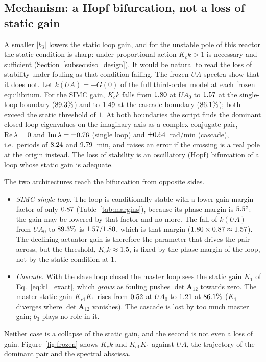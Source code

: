 \subsection{Mechanism: a Hopf bifurcation, not a loss of static gain}
\label{subsec:mechanism}
A smaller $|b_3|$ lowers the static loop gain, and for the unstable pole of this reactor the static condition is sharp: under proportional action $K_ck>1$ is necessary and sufficient (Section~\ref{subsec:siso_design}). It would be natural to read the loss of stability under fouling as that condition failing. The frozen-$UA$ spectra show that it does not. Let $k(UA)=-G(0)$ of the full third-order model at each frozen equilibrium. For the SIMC gain, $K_ck$ falls from $1.80$ at $UA_0$ to $1.57$ at the single-loop boundary ($89.3\%$) and to $1.49$ at the cascade boundary ($86.1\%$); both exceed the static threshold of $1$. At both boundaries the script finds the dominant closed-loop eigenvalues on the imaginary axis as a complex-conjugate pair, $\mathrm{Re}\,\lambda=0$ and $\mathrm{Im}\,\lambda=\pm0.76$ (single loop) and $\pm0.64$~rad/min (cascade), i.e.\ periods of $8.24$ and $9.79$~min, and raises an error if the crossing is a real pole at the origin instead. The loss of stability is an oscillatory (Hopf) bifurcation of a loop whose static gain is adequate.

The two architectures reach the bifurcation from opposite sides.
\begin{itemize}
    \item \emph{SIMC single loop.} The loop is conditionally stable with a lower gain-margin factor of only $0.87$ (Table~\ref{tab:margins}), because its phase margin is $5.5^\circ$: the gain may be lowered by that factor and no more. The fall of $k(UA)$ from $UA_0$ to $89.3\%$ is $1.57/1.80$, which is that margin ($1.80\times0.87\approx1.57$). The declining actuator gain is therefore the parameter that drives the pair across, but the threshold, $K_ck\approx1.5$, is fixed by the phase margin of the loop, not by the static condition at $1$.
    \item \emph{Cascade.} With the slave loop closed the master loop sees the static gain $K_1$ of Eq.~\eqref{eq:k1_exact}, which \emph{grows} as fouling pushes $\det\mathbf{A}_{12}$ towards zero. The master static gain $K_{c1}K_1$ rises from $0.52$ at $UA_0$ to $1.21$ at $86.1\%$ ($K_1$ diverges where $\det\mathbf{A}_{12}$ vanishes). The cascade is lost by too much master gain; $b_3$ plays no role in it.
\end{itemize}
Neither case is a collapse of the static gain, and the second is not even a loss of gain. Figure~\ref{fig:frozen} shows $K_ck$ and $K_{c1}K_1$ against $UA$, the trajectory of the dominant pair and the spectral abscissa.
